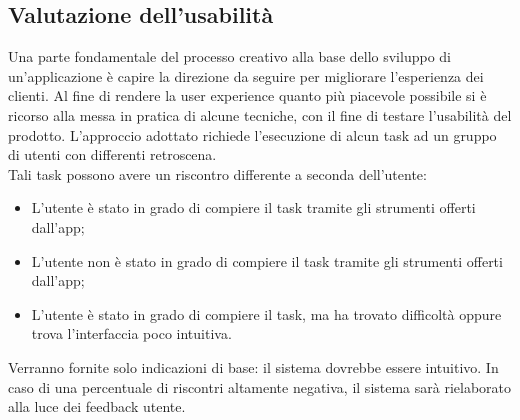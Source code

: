 \documentclass{natourDoc}
\begin{document}
\subsection{Valutazione dell'usabilità}
Una parte fondamentale del processo creativo alla base dello sviluppo di un'applicazione è capire la direzione da seguire per migliorare l’esperienza dei clienti.
Al fine di rendere la user experience quanto più piacevole possibile si è ricorso alla messa in pratica di alcune tecniche, con il fine di testare l’usabilità del prodotto.
L’approccio adottato richiede l'esecuzione di alcun task ad un gruppo di utenti con differenti retroscena. \\

Tali task possono avere un riscontro differente a seconda dell'utente:
\begin{itemize}
	\item L’utente è stato in grado di compiere il task tramite gli strumenti offerti dall’app;
	\item L’utente non è stato in grado di compiere il task tramite gli strumenti offerti dall’app;
	\item L'utente è stato in grado di compiere il task, ma ha trovato difficoltà oppure trova l'interfaccia poco intuitiva.
\end{itemize}

Verranno fornite solo indicazioni di base: il sistema dovrebbe essere intuitivo. In caso di una percentuale di riscontri altamente
negativa, il sistema sarà rielaborato alla luce dei feedback utente.
\end{document}

